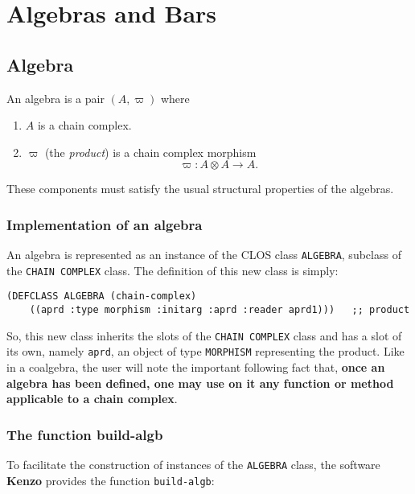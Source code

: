 \chapter{Algebras and Bars}

\section{Algebra}

An algebra  is a pair $(A, \varpi)$ where
\begin{enumerate}
\item $A$ is a chain complex.
\item $\varpi$ (the {\em product}) is a chain complex morphism
$$\varpi:  A \otimes A  \rightarrow A.$$
\end{enumerate}

These components must satisfy the usual structural properties of the algebras.

\subsection {Implementation of an algebra}

An algebra  is represented as an instance
of the CLOS class {\tt ALGEBRA}, subclass
of the {\tt CHAIN COMPLEX} class. The definition of this new class is simply:
{\footnotesize\begin{verbatim}
(DEFCLASS ALGEBRA (chain-complex)
    ((aprd :type morphism :initarg :aprd :reader aprd1)))   ;; product
\end{verbatim}}

So, this new class inherits the slots of the {\tt CHAIN COMPLEX} class and has a slot
of its own, namely {\tt aprd}, an  object of type {\tt MORPHISM} representing the product. Like in a coalgebra,
the user will note the important following fact that, {\bf once an algebra has been defined, one may use on it any
function or method applicable to a chain complex}.

\subsection {The function build-algb}

To facilitate the construction of instances of the {\tt ALGEBRA} class,
the software {\bf Kenzo} provides the function {\tt build-algb}:

